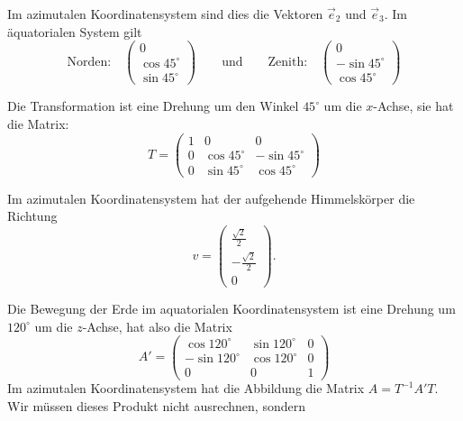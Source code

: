 \begin{loesung}
\begin{teilaufgaben}
\item Im azimutalen Koordinatensystem sind dies die Vektoren $\vec e_2$
und $\vec e_3$. Im äquatorialen System gilt
\[
\text{Norden:} \quad \begin{pmatrix}0\\ \cos 45^\circ\\\sin 45^\circ\end{pmatrix}
\qquad\text{und}\qquad
\text{Zenith:} \quad \begin{pmatrix}0\\-\sin 45^\circ\\\cos 45^\circ\end{pmatrix}
\]

\item Die Transformation ist eine Drehung um den Winkel $45^\circ$
um die $x$-Achse, sie hat die Matrix:
\[
T=\begin{pmatrix}
1& 0            & 0            \\
0& \cos 45^\circ&-\sin 45^\circ\\
0& \sin 45^\circ& \cos 45^\circ
\end{pmatrix}
\]
\item Im azimutalen Koordinatensystem hat der aufgehende Himmelskörper
die Richtung
\[
v=\begin{pmatrix}
\frac{\sqrt{2}}2\\-\frac{\sqrt{2}}2\\0
\end{pmatrix}.
\]
\item
Die Bewegung der Erde im aquatorialen Koordinatensystem ist eine Drehung
um $ 120^\circ$ um die $z$-Achse, hat also die Matrix
\[
A'=\begin{pmatrix}
 \cos 120^\circ & \sin 120^\circ & 0\\
-\sin 120^\circ & \cos 120^\circ & 0\\
 0              & 0              & 1
\end{pmatrix}
\]
Im azimutalen Koordinatensystem hat die Abbildung die Matrix
$A=T^{-1}A'T.$ Wir müssen dieses Produkt nicht ausrechnen, sondern

\end{teilaufgaben}
\end{loesung}
